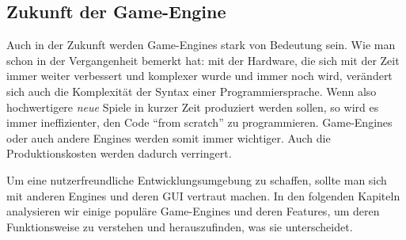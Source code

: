 \subsection{Zukunft der Game-Engine}

Auch in der Zukunft werden Game-Engines stark von Bedeutung sein. Wie man schon in der Vergangenheit bemerkt hat: mit der Hardware, die sich mit der Zeit immer weiter verbessert und komplexer wurde und immer noch wird, verändert sich auch die Komplexität der Syntax einer Programmiersprache.
Wenn also hochwertigere \textit{neue} Spiele in kurzer Zeit produziert werden sollen, so wird es immer ineffizienter, den Code "`from scratch"' zu programmieren. Game-Engines oder auch andere Engines  werden somit immer wichtiger. Auch die Produktionskosten werden dadurch verringert.

Um eine nutzerfreundliche Entwicklungsumgebung zu schaffen, sollte man sich mit anderen Engines und deren GUI vertraut machen. In den folgenden Kapiteln analysieren wir einige populäre Game-Engines und deren Features, um deren Funktionsweise zu verstehen und herauszufinden, was sie unterscheidet.